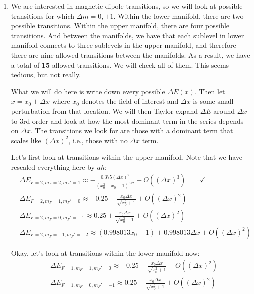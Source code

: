 \documentclass{article}
\theoremstyle{definition}
\begin{document}
\begin{enumerate}[label=(\alph*)]
	
	\item We are interested in magnetic dipole transitions, so we will look at possible transitions for which $\Delta m = 0,\pm 1$. Within the lower manifold, there are two possible transitions. Within the upper manifold, there are four possible transitions. And between the manifolds, we have that each sublevel in lower manifold connects to three sublevels in the upper manifold, and therefore there are nine allowed transitions between the manifolds. As a result, we have a total of \textbf{15} allowed transitions. We will check all of them. This seems tedious, but not really. 
	
	
	What we will do here is write down every possible $\Delta E (x)$. Then let $x = x_0 + \Delta x$ where $x_0$ denotes the field of interest and $\Delta x$ is some small perturbation from that location. We will then Taylor expand $\Delta E$ around $\Delta x$ to 3rd order and look at how the most dominant term in the series depends on $\Delta x$. The transitions we look for are those with a dominant term that scales like $(\Delta x)^2$, i.e., those with no $\Delta x$ term. 
	
	Let's first look at transitions within the upper manifold. Note that we have rescaled everything here by $ah$:
	\begin{align*}
	&\Delta E_{F=2, m_F=2,m_F'=1} \approx -\frac{0.375 (\Delta x)^2}{\left(x_0^2+x_0+1\right)^{3/2}}+O\left((\Delta x)^3\right) \quad\quad \checkmark\\
	&\Delta E_{F=2, m_F=1,m_F'=0} \approx -0.25-\frac{x_0\Delta x }{\sqrt{x_0^2+1}}+O\left((\Delta x)^2\right)\\
	&\Delta E_{F=2, m_F=0,m_F'=-1} \approx 0.25+\frac{x_0\Delta x}{\sqrt{x_0^2+1}}+O\left((\Delta x)^2\right)\\
	&\Delta E_{F=2, m_F=-1,m_F'=-2} \approx (0.998013 x_0-1)+0.998013 \Delta x+O\left((\Delta x)^2\right)
	\end{align*}
	
	Okay, let's look at transitions within the lower manifold now:
	\begin{align*}
	&\Delta E_{F=1, m_F=1,m_F'=0} \approx -0.25-\frac{x_0\Delta x }{\sqrt{x_0^2+1}}+O\left((\Delta x)^2\right)\\
	&\Delta E_{F=1, m_F=0,m_F'=-1} \approx 0.25-\frac{x_0\Delta x }{\sqrt{x_0^2+1}}+O\left((\Delta x)^2\right)\\
	\end{align*}
	

\end{enumerate}
\end{document}
